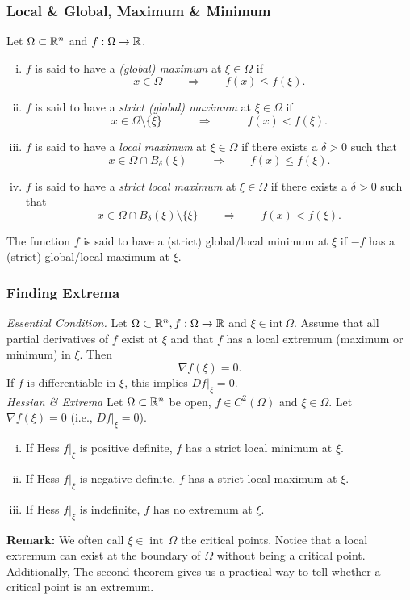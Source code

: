 \documentclass[11pt, t]{beamer}
\renewcommand{\emph}[1]{{\color{Turquoise3}\textsl{#1}}}
\newcommand{\nullspace}{~\\[15pt]}
\begin{document}
\begin{frame}
    \frametitle{Local \& Global, Maximum \& Minimum}
    Let $\Omega\subset\mathbb{R}^n$ and $f:\Omega\to\mathbb{R}$.

    \begin{enumerate}[(i)]
        \item $f$ is said to have a \emph{(global) maximum} at $\xi\in\Omega$ if
              \[x\in\Omega\qquad\Rightarrow\qquad
                  f(x)\leq f(\xi).\]
        \item $f$ is said to have a \emph{strict (global) maximum} at $\xi\in\Omega$ if
              \[x\in\Omega\setminus\{\xi\}\qquad\quad
                  \Rightarrow\qquad\quad f(x)<f(\xi).\]
        \item $f$ is said to have a \emph{local maximum} at $\xi\in\Omega$ if there exists a $\delta>0$ such that
              \[x\in\Omega\cap B_\delta(\xi)\qquad\Rightarrow\qquad
                  f(x)\leq f(\xi).\]
        \item $f$ is said to have a \emph{strict local maximum} at $\xi\in\Omega$ if there exists a $\delta>0$ such that
              \[x\in\Omega\cap B_\delta(\xi)\setminus\{\xi\}\qquad
                  \Rightarrow\qquad f(x)<f(\xi).\]
    \end{enumerate}
    The function $f$ is said to have a (strict) global/local minimum at $\xi$ if $-f$ has a (strict) global/local maximum at $\xi$.
\end{frame}

\begin{frame}
    \frametitle{Finding Extrema}
    \emph{Essential Condition.} Let $\Omega\subset\mathbb{R}^n,f:\Omega\to\mathbb{R}$ and $\xi\in\text{int}\,\Omega$. Assume that all partial derivatives of $f$ exist at $\xi$ and that $f$ has a local extremum (maximum or minimum) in $\xi$. Then
    \[\nabla f(\xi)=0.\]
    If $f$ is dif{}ferentiable in $\xi$, this implies $Df|_\xi=0$.
    \nullspace
    \emph{Hessian \& Extrema} Let $\Omega\subset\mathbb{R}^n$ be open, $f\in C^2(\Omega)$ and $\xi\in\Omega$. Let $\nabla f(\xi)=0$ (i.e., $Df|_\xi=0$).
    \begin{enumerate}[(i)]
        \item If Hess $f|_\xi$ is positive definite, $f$ has a strict local minimum at $\xi$.
        \item If Hess $f|_\xi$ is negative definite, $f$ has a strict local maximum at $\xi$.
        \item If Hess $f|_\xi$ is indefinite, $f$ has no extremum at $\xi$.
    \end{enumerate}
    \vspace{8pt}
    \textbf{Remark:} We often call $\xi\in\operatorname{int}\,\Omega$ the critical points. Notice that a local extremum can exist at the boundary of $\Omega$ without being a critical point. Additionally, The second theorem gives us a practical way to tell whether a critical point is an extremum.
\end{frame}
\end{document}
